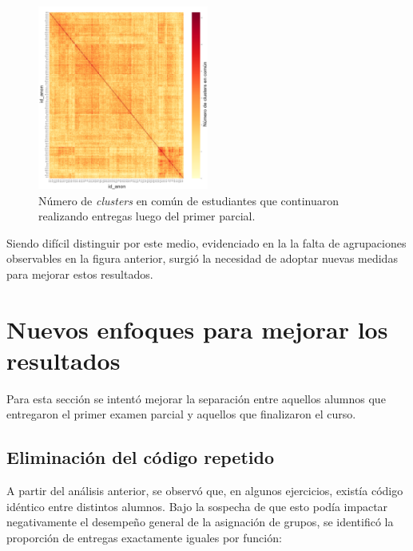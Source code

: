 \documentclass[11pt,a4paper,twoside,openany]{tesis}
\begin{document}
\begin{figure}[H]
    \centering
    \includegraphics[width=0.5\textwidth]{imagenes/clusters-no-13.png}
    \caption{Número de  \emph{clusters} en común de estudiantes que continuaron realizando entregas luego del primer parcial.}
\end{figure}

Siendo difícil distinguir por este medio, evidenciado en la la falta de agrupaciones observables en la figura anterior, surgió la necesidad de adoptar nuevas medidas para mejorar estos resultados.

\section{Nuevos enfoques para mejorar los resultados}

Para esta sección se intentó mejorar la separación entre aquellos alumnos que entregaron el primer examen parcial y aquellos que finalizaron el curso. 

\subsection{Eliminación del código repetido}

A partir del análisis anterior, se observó que, en algunos ejercicios, existía código idéntico entre distintos alumnos. Bajo la sospecha de que esto podía impactar negativamente el desempeño general de la asignación de grupos, se identificó la proporción de entregas exactamente iguales por función:
\end{document}
